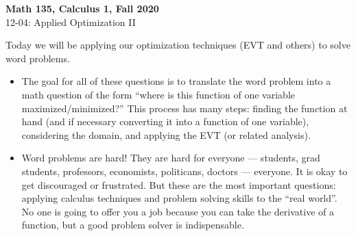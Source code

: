 \documentclass[11pt,reqno,final]{amsart}
\numberwithin{figure}{section}
\theoremstyle{definition} %
\begin{document}
\begin{center}
        \textbf{\Large Math 135, Calculus 1, Fall 2020}\\[10pt]
        {\large 12-04: Applied Optimization II}
\end{center}

\thispagestyle{empty}


\renewcommand{\thesection}{\Alph{section}}

Today we will be applying our optimization techniques (EVT and others) to solve word problems.
\begin{itemize}
\item The goal for all of these questions is to translate the word problem into a math question of the form
        ``where is this function of one variable maximized/minimized?''
        This process has many steps: finding the function at hand (and if necessary converting it into a function of one variable), considering the domain, and applying the EVT (or related analysis).
\item Word problems are hard! They are hard for everyone --- students, grad students, professors, economists, politicans, doctors --- everyone.
        It is okay to get discouraged or frustrated. But these are the most important questions: applying calculus techniques and problem solving skills to the ``real world''.
        No one is going to offer you a job because you can take the derivative of a function, but a good problem solver is indispensable. 
\end{itemize}
\end{document}
